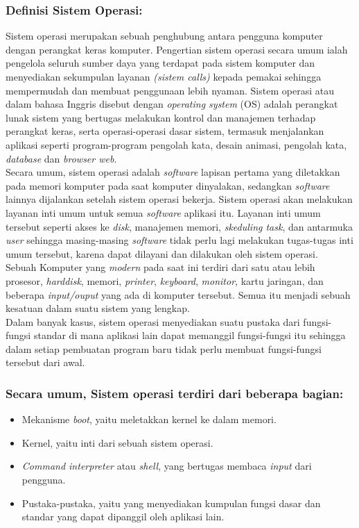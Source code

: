 \documentclass[12pt]{article}
\begin{document}
\subsubsection *{Definisi Sistem Operasi:}
Sistem operasi merupakan sebuah penghubung antara pengguna komputer dengan perangkat keras komputer. Pengertian sistem operasi secara umum ialah pengelola seluruh sumber daya yang terdapat pada sistem komputer dan menyediakan sekumpulan layanan \textit{(sistem calls)} kepada pemakai sehingga mempermudah dan membuat penggunaan lebih nyaman. Sistem operasi atau dalam bahasa Inggris disebut dengan \textit{operating system} (OS) adalah perangkat lunak sistem yang bertugas melakukan kontrol dan manajemen terhadap perangkat keras, serta operasi-operasi dasar sistem, termasuk menjalankan aplikasi seperti program-program pengolah kata, desain animasi, pengolah kata, \textit{database} dan \textit{browser web}. 
\\[12pt]
Secara umum, sistem operasi adalah \textit{software} lapisan pertama yang diletakkan pada memori komputer pada saat komputer dinyalakan, sedangkan \textit{software} lainnya dijalankan setelah sistem operasi bekerja. Sistem operasi akan melakukan layanan inti umum untuk semua \textit{software} aplikasi itu. Layanan inti umum tersebut seperti akses ke \textit{disk}, manajemen memori, \textit{skeduling task}, dan antarmuka \textit{user} sehingga masing-masing \textit{software} tidak perlu lagi melakukan tugas-tugas inti umum tersebut, karena dapat dilayani dan dilakukan oleh sistem operasi. 
\\[12pt]
Sebuah Komputer yang \textit{modern} pada saat ini terdiri dari satu atau lebih prosesor, \textit{harddisk}, memori, \textit{printer}, \textit{keyboard}, \textit{monitor}, kartu jaringan, dan beberapa \textit{input/ouput} yang ada di komputer tersebut. Semua itu menjadi sebuah kesatuan dalam suatu sistem yang lengkap.
\\[12pt]
Dalam banyak kasus, sistem operasi menyediakan suatu pustaka dari fungsi-fungsi standar di mana aplikasi lain dapat memanggil fungsi-fungsi itu sehingga dalam setiap pembuatan program baru tidak perlu membuat fungsi-fungsi tersebut dari awal.
\subsubsection *{Secara umum, Sistem operasi terdiri dari beberapa bagian:}
\begin{itemize}
    \item Mekanisme \textit{boot}, yaitu meletakkan kernel ke dalam memori.
    \item Kernel, yaitu inti dari sebuah sistem operasi.
    \item \textit{Command interpreter} atau \textit{shell}, yang bertugas membaca \textit{input} dari pengguna.
    \item Pustaka-pustaka, yaitu yang menyediakan kumpulan fungsi dasar dan standar yang dapat dipanggil oleh aplikasi lain.
\end{itemize}
\end{document}
